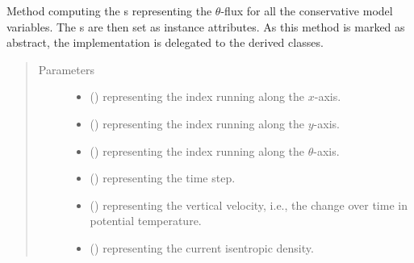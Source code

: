 \documentclass[letterpaper,10pt,english]{sphinxmanual}
\begin{document}
\begin{fulllineitems}

\begin{fulllineitems}
\label{\detokenize{api:tasmania.dycore.flux_isentropic.FluxIsentropic._compute_vertical_fluxes}}
Method computing the s representing the \(\theta\)-flux
for all the conservative model variables. The s are then
set as instance attributes.
As this method is marked as abstract, the implementation is delegated to the derived classes.
\begin{quote}\begin{description}
\item[{Parameters}] \leavevmode\begin{itemize}
\item {} 
 () \textendash{}  representing the index running along the \(x\)-axis.

\item {} 
 () \textendash{}  representing the index running along the \(y\)-axis.

\item {} 
 () \textendash{}  representing the index running along the \(\theta\)-axis.

\item {} 
 () \textendash{}  representing the time step.

\item {} 
 () \textendash{}  representing the vertical velocity,
i.e., the change over time in potential temperature.

\item {} 
 () \textendash{}  representing the current isentropic density.


\end{itemize}
\end{description}
\end{quote}
\end{fulllineitems}
\end{fulllineitems}
\end{document}
